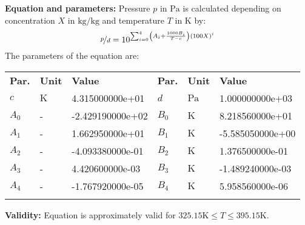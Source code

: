\textbf{Equation and parameters:}
\newline
%
Pressure $p$ in $\si{\pascal}$ is calculated depending on concentration $X$ in $\si{\kilogram\per\kilogram}$ and  temperature $T$ in $\si{\kelvin}$ by:
%
\begin{equation*}
\nicefrac{p}{d} = 10 ^ { \sum_{i=0}^{4} \left( A_i + \frac{1000 B_i}{T - c} \right) \left( 100 X \right) ^{i}}
\end{equation*}
%
The parameters of the equation are:
%
\begin{longtable}[l]{lll|lll}
\toprule
\addlinespace
\textbf{Par.} & \textbf{Unit} & \textbf{Value} &	\textbf{Par.} & \textbf{Unit} & \textbf{Value} \\
\addlinespace
\midrule
\endhead

\bottomrule
\endfoot
\bottomrule
\endlastfoot
\addlinespace

$c$ & $\si{\kelvin}$ & 4.315000000e+01 & $d$ & $\si{\pascal}$ & 1.000000000e+03 \\
$A_0$ & - & -2.429190000e+02 & $B_0$ & $\si{\kelvin}$ & 8.218560000e+01 \\
$A_1$ & - & 1.662950000e+01 & $B_1$ & $\si{\kelvin}$ & -5.585050000e+00 \\
$A_2$ & - & -4.093380000e-01 & $B_2$ & $\si{\kelvin}$ & 1.376500000e-01 \\
$A_3$ & - & 4.420600000e-03 & $B_3$ & $\si{\kelvin}$ & -1.489240000e-03 \\
$A_4$ & - & -1.767920000e-05 & $B_4$ & $\si{\kelvin}$ & 5.958560000e-06 \\

\addlinespace\end{longtable}

\textbf{Validity:}
\newline
Equation is approximately valid for $325.15 \si{\kelvin} \leq T \leq 395.15 \si{\kelvin}$.
\newline

